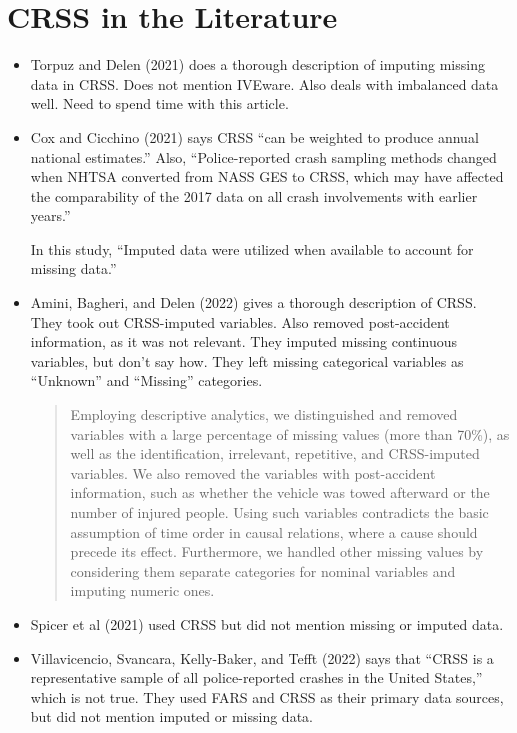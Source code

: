 \section{CRSS in the Literature}

\begin{itemize}
	\item Torpuz and Delen (2021) \cite{TOPUZ2021113557} does a thorough description of imputing missing data in CRSS.  Does not mention IVEware.  Also deals with imbalanced data well.  Need to spend time with this article. 

	\item Cox and Cicchino (2021) \cite{COX2021288} says CRSS ``can be
weighted to produce annual national estimates.''  Also, ``Police-reported
crash sampling methods changed when NHTSA converted from
NASS GES to CRSS, which may have affected the comparability of
the 2017 data on all crash involvements with earlier years.''
	
	In this study, 
	``Imputed data were utilized when available to account for missing data.''
	
	\item Amini, Bagheri, and Delen (2022) \cite{AMINI2022108720} gives a thorough description of CRSS.  They took out CRSS-imputed variables.  Also removed post-accident information, as it was not relevant.  They imputed missing continuous variables, but don't say how.  They left missing categorical variables as ``Unknown'' and ``Missing'' categories.  
	
\begin{quote}
	Employing descriptive analytics, we distinguished and removed
variables with a large percentage of missing values (more than 70\%), as
well as the identification, irrelevant, repetitive, and CRSS-imputed
variables. We also removed the variables with post-accident information,
such as whether the vehicle was towed afterward or the number of
injured people. Using such variables contradicts the basic assumption of
time order in causal relations, where a cause should precede its effect.
Furthermore, we handled other missing values by considering them
separate categories for nominal variables and imputing numeric ones.
\end{quote}	

	\item Spicer et al (2021) \cite{SPICER2021105974} used CRSS but did not mention missing or imputed data.  
	
	\item Villavicencio, Svancara, Kelly-Baker, and Tefft (2022) \cite{VILLAVICENCIO2022757} says that ``CRSS is a representative
sample of all police-reported crashes in the United States,'' which is not true.  They used FARS and CRSS as their primary data sources, but did not mention imputed or missing data.  
	

\end{itemize}
